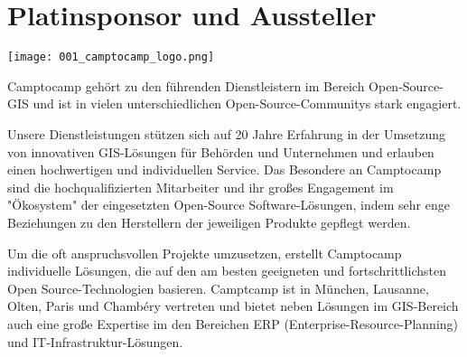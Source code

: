 \section*{Platinsponsor und Aussteller}
\begin{center}
  \texttt{[image: 001\_camptocamp\_logo.png]}
\end{center}
Camptocamp gehört zu den führenden Dienstleistern im Bereich Open-Source-GIS und ist in vielen unterschiedlichen Open-Source-Communitys stark engagiert.

Unsere Dienstleistungen stützen sich auf 20 Jahre Erfahrung in der Umsetzung von innovativen GIS-Lösungen für Behörden und Unternehmen und erlauben einen hochwertigen und individuellen Service. Das Besondere an Camptocamp sind die hochqualifizierten Mitarbeiter und ihr großes Engagement im "Ökosystem" der eingesetzten Open-Source Software-Lösungen, indem sehr enge Beziehungen zu den Herstellern der jeweiligen Produkte gepflegt werden.

Um die oft anspruchsvollen Projekte umzusetzen, erstellt Camptocamp individuelle Lösungen, die auf den am besten geeigneten und fortschrittlichsten Open Source-Technologien basieren. Camptcamp ist in München, Lausanne, Olten, Paris und Chambéry vertreten und bietet neben Lösungen im GIS-Bereich auch eine große Expertise im den Bereichen ERP (Enterprise-Resource-Planning) und IT-Infrastruktur-Lösungen.
